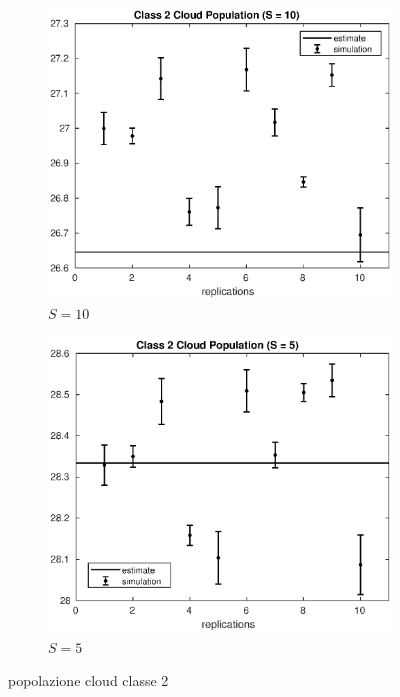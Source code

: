 \begin{figure}[!h]
%
\begin{subfigure}[t]{0.49\textwidth}
\includegraphics[width=\textwidth]{figures/simul/10_500K_n2cloud}
\caption{$S = 10$}
\label{10_n2cloud}
\end{subfigure}
%
\begin{subfigure}[t]{0.49\textwidth}
\includegraphics[width=\textwidth]{figures/simul/5_500K_n2cloud}
\caption{$S = 5$}
\label{5_n2cloud}
\end{subfigure}
%
\caption{popolazione cloud classe 2}
\label{plot:n2cloud}
\end{figure}
%
%

